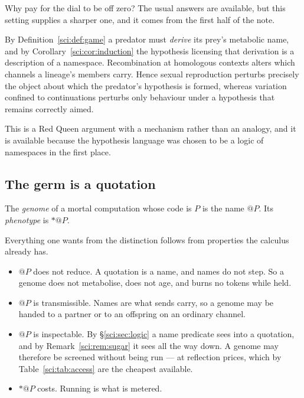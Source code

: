 Why pay for the dial to be off zero? The usual answers are available, but this setting supplies a
sharper one, and it comes from the first half of the note.

\begin{proposition}
\label{sci:prop:sexdefence}
By Definition~\ref{sci:def:game} a predator must \emph{derive} its prey's metabolic name, and by
Corollary~\ref{sci:cor:induction} the hypothesis licensing that derivation is a description of a
namespace. Recombination at homologous contexts alters which channels a lineage's members carry.
Hence sexual reproduction perturbs precisely the object about which the predator's hypothesis is
formed, whereas variation confined to continuations perturbs only behaviour under a hypothesis that
remains correctly aimed.
\end{proposition}

This is a Red Queen argument with a mechanism rather than an analogy, and it is available because the
hypothesis language was chosen to be a logic of namespaces in the first place.

\subsection{The germ is a quotation}\label{sci:S12.2}

\begin{definition}
\label{sci:def:genome}
The \emph{genome} of a mortal computation whose code is $P$ is the name $@P$. Its \emph{phenotype} is
$\ast @P$.
\end{definition}

Everything one wants from the distinction follows from properties the calculus already has.

\begin{itemize}
\item $@P$ does not reduce. A quotation is a name, and names do not step. So a genome does not
metabolise, does not age, and burns no tokens while held.
\item $@P$ is transmissible. Names are what sends carry, so a genome may be handed to a partner or
to an offspring on an ordinary channel.
\item $@P$ is inspectable. By \S\ref{sci:sec:logic} a name predicate sees into a quotation, and by
Remark~\ref{sci:rem:sugar} it sees all the way down. A genome may therefore be screened without being
run --- at reflection prices, which by Table~\ref{sci:tab:access} are the cheapest available.
\item $\ast @P$ costs. Running is what is metered.
\end{itemize}


